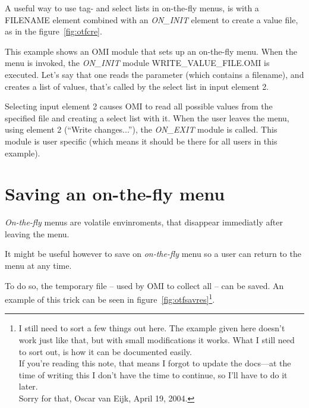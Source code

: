\documentclass[a4paper]{book}
\newcommand{\vs}{\vspace{3mm}}
\begin{document}
A useful way to use tag- and select lists in on-the-fly menus, is with a 
FILENAME element combined with an \textsl{ON{\_}INIT} element to create a value file, 
as in the figure~\ref{fig:otfcre}.

This example shows an OMI module that sets up an on-the-fly menu. When the 
menu is invoked, the \textsl{ON{\_}INIT} module WRITE{\_}VALUE{\_}FILE.OMI is 
executed. Let's say that one reads the parameter (which contains a 
filename), and creates a list of values, that's called by the select list in 
input element 2.

Selecting input element 2 causes OMI to read all possible values from the 
specified file and creating a select list with it. When the user leaves the 
menu, using element 2 (``Write changes...''), the \textsl{ON{\_}EXIT} module is called.
This module is user specific (which means it should be there for all users in
this example).

\section{Saving an on-the-fly menu}
\label{subsec:saveotf}

\textit{On-the-fly} menus are volatile envinroments, that disappear immediatly
after leaving the menu.

It might be useful however to save on \textit{on-the-fly} menu so a user
can return to the menu at any time.

\vs

To do so, the temporary file -- used by OMI to collect all -- can be
saved. An example of this trick can be seen in figure~\ref{fig:otfsavres}\footnote{ I still need to sort a few things out here. The example
given here doesn't work just like that, but with small modifications it works.
What I still need to sort out, is how it can be documented easily. \\
If you're reading this note, that means I forgot to update the docs---at the time of
writing this I don't have the time to continue, so I'll have to do it later.\\
Sorry for that, Oscar van Eijk, April 19, 2004.}.
\end{document}
